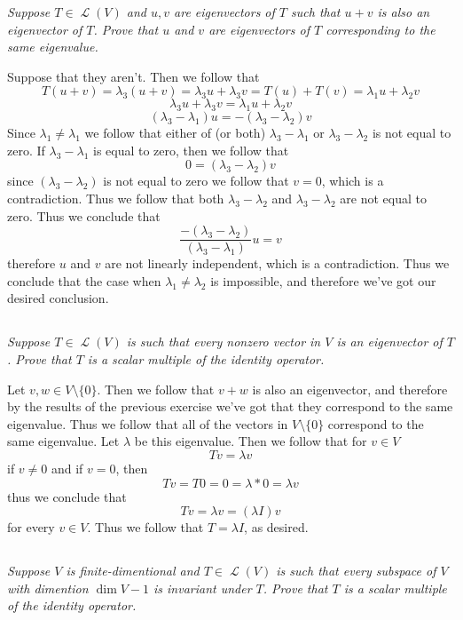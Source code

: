\documentclass[11pt,oneside,titlepage]{book}
\DeclareMathOperator \map {\mathcal {L}}
\begin{document}
\textit{Suppose $T \in \map(V)$ and $u, v$ are eigenvectors of $T$ such that $u + v$ is also an
  eigenvector of $T$. Prove that $u$ and $v$ are eigenvectors of $T$ corresponding to the same
  eigenvalue.}

Suppose that they aren't. Then we follow that
$$T(u + v) = \lambda_3(u + v) =  \lambda_3 u + \lambda_3 v =
T(u) + T(v) = \lambda_1 u + \lambda_2 v$$
$$\lambda_3 u + \lambda_3 v = \lambda_1 u + \lambda_2 v$$
$$(\lambda_3 - \lambda_1) u =  - (\lambda_3  - \lambda_2) v$$
Since $\lambda_1 \neq \lambda_1$ we follow that either of (or both) $\lambda_3 - \lambda_1$ or
$\lambda_3  - \lambda_2$ is not equal to zero.
If  $\lambda_3 - \lambda_1$ is equal to zero, then we follow that
$$0 = (\lambda_3 - \lambda_2) v$$
since $(\lambda_3 - \lambda_2)$ is not equal to zero we follow that $v = 0$, which is
a contradiction. Thus we follow that both $\lambda_3  - \lambda_2$ and $\lambda_3  - \lambda_2$
are not equal to zero. Thus we conclude that 
$$\frac{ - (\lambda_3  - \lambda_2)}{(\lambda_3 - \lambda_1)} u =  v$$
therefore $u$ and $v$ are not linearly independent, which is a contradiction. Thus we
conclude that the case when $\lambda_1 \neq \lambda_2$ is impossible, and therefore
we've got our desired conclusion.


\subsection{}

\textit{Suppose $T \in \map(V)$ is such that every nonzero vector in $V$ is an eigenvector of $T$.
  Prove that $T$ is a scalar multiple of the identity operator.}

Let $v, w \in V \setminus \{0\}$.
Then we follow that $v + w$ is also an eigenvector, and therefore by the
results of the previous exercise we've got that they correspond to the same eigenvalue. Thus
we follow that all of the vectors in $V \setminus \{0\}$ correspond to the same eigenvalue.
Let $\lambda$ be this eigenvalue. Then we follow that for $v \in V$
$$Tv = \lambda v$$
if $v \neq 0$ and if $v = 0$, then
$$Tv = T0 = 0 = \lambda * 0 = \lambda v$$
thus we conclude that
$$Tv = \lambda v = (\lambda I)v$$
for every $v \in V$. Thus we follow that $T = \lambda I$, as desired.

\subsection{}

\textit{Suppose $V$ is finite-dimentional and $T \in \map(V)$ is such that every subspace of $V$
  with dimention $\dim V - 1$ is invariant under $T$. Prove that $T$ is a scalar multiple of
  the identity operator.}
\end{document}

